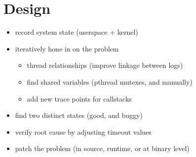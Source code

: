 \section{Design} \label{sec:design}

\begin{itemize}
    \item record system state (userspace + kernel)
    \item iteratively hone in on the problem
    \begin{itemize}
        \item thread relationships (improve linkage between logs)
        \item find shared variables (pthread mutexes, and manually)
        \item add new trace points for callstacks
    \end{itemize}
    \item find two distinct states (good, and buggy)
    \item verify root cause by adjusting timeout values
    \item patch the problem (in source, runtime, or at binary level)
\end{itemize}
